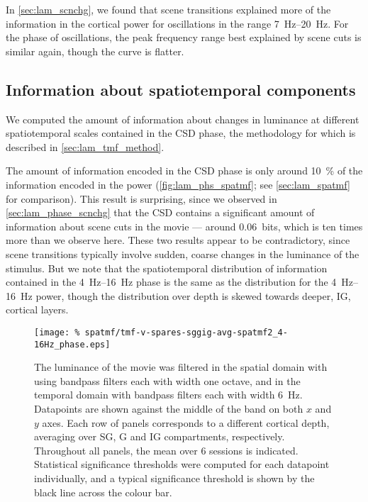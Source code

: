 In \autoref{sec:lam_scnchg}, we found that scene transitions explained more of the information in the cortical power for oscillations in the range \SIrange{7}{20}{Hz}.
For the phase of oscillations, the peak frequency range best explained by scene cuts is similar again, though the curve is flatter.


\subsection{Information about spatiotemporal components}

We computed the amount of information about changes in luminance at different spatiotemporal scales contained in the \ac{CSD} phase, the methodology for which is described in \autoref{sec:lam_tmf_method}.

The amount of information encoded in the \ac{CSD} phase is only around \SI{10}{\percent} of the information encoded in the power (\autoref{fig:lam_phs_spatmf}; see \autoref{sec:lam_spatmf} for comparison).
This result is surprising, since we observed in \autoref{sec:lam_phase_scnchg} that the \ac{CSD} contains a significant amount of information about scene cuts in the movie --- around \SI{0.06}{bits}, which is ten times more than we observe here.
These two results appear to be contradictory, since scene transitions typically involve sudden, coarse changes in the luminance of the stimulus.
But we note that the spatiotemporal distribution of information contained in the \SIrange{4}{16}{Hz} phase is the same as the distribution for the \SIrange{4}{16}{Hz} power, though the distribution over depth is skewed towards deeper, \ac{IG}, cortical layers.


\begin{figure}[tbp]
\centering
    \texttt{[image: \%
spatmf/tmf-v-spares-sggig-avg-spatmf2\_4-16Hz\_phase.eps]}
\caption{%
The luminance of the movie was filtered in the spatial domain with using bandpass filters each with width one octave, and in the temporal domain with bandpass filters each with width \SI{6}{Hz}.
Datapoints are shown against the middle of the band on both $x$ and $y$ axes.
Each row of panels corresponds to a different cortical depth, averaging over \ac{SG}, \ac{G} and \ac{IG} compartments, respectively.
Throughout all panels, the mean over \num{6} sessions is indicated.
Statistical significance thresholds were computed for each datapoint individually, and a typical significance threshold is shown by the black line across the colour bar.
}%
\label{fig:lam_phs_spatmf}
%
\end{figure}


